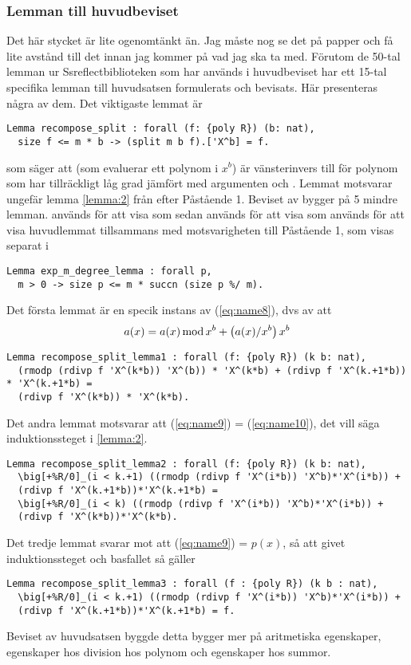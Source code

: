 \subsubsection{Lemman till huvudbeviset}
Det här stycket är lite ogenomtänkt än. Jag måste nog se det på papper och få
lite avstånd till det innan jag kommer på vad jag ska ta med. Förutom de 50-tal
lemman ur Ssreflectbiblioteken som har används i huvudbeviset har ett 15-tal
specifika lemman till huvudsatsen formulerats och bevisats. Här presenteras
några av dem. Det viktigaste lemmat är
\begin{lstlisting}
Lemma recompose_split : forall (f: {poly R}) (b: nat),
  size f <= m * b -> (split m b f).['X^b] = f.
\end{lstlisting}
som säger att  (som evaluerar ett polynom i $x^b$) är
vänsterinvers till  för polynom som har tillräckligt låg grad jämfört
med argumenten  och . Lemmat motsvarar ungefär lemma \ref{lemma:2}
från efter Påstående 1. Beviset av  bygger på 5 mindre
lemman.  används för att visa
 som sedan används för att visa
 som används för att visa huvudlemmat tillsammans med
motsvarigheten till Påstående 1, som visas separat i
\begin{lstlisting}
Lemma exp_m_degree_lemma : forall p,
  m > 0 -> size p <= m * succn (size p %/ m).
\end{lstlisting}
Det första lemmat är en specik instans av (\ref{eq:name8}), dvs av att
\begin{align}
  a(x)= a(x)  \operatorname*{mod} x^b + \left(a(x)/x^b\right) x^b \label{eq:name8}
\end{align}
\begin{lstlisting}
Lemma recompose_split_lemma1 : forall (f: {poly R}) (k b: nat),
  (rmodp (rdivp f 'X^(k*b)) 'X^(b)) * 'X^(k*b) + (rdivp f 'X^(k.+1*b)) * 'X^(k.+1*b) =
  (rdivp f 'X^(k*b)) * 'X^(k*b).
\end{lstlisting}
Det andra lemmat motsvarar att (\ref{eq:name9}) = (\ref{eq:name10}), det vill
säga induktionssteget
i \ref{lemma:2}.
\begin{lstlisting}
Lemma recompose_split_lemma2 : forall (f: {poly R}) (k b: nat),
  \big[+%R/0]_(i < k.+1) ((rmodp (rdivp f 'X^(i*b)) 'X^b)*'X^(i*b)) +
  (rdivp f 'X^(k.+1*b))*'X^(k.+1*b) =
  \big[+%R/0]_(i < k) ((rmodp (rdivp f 'X^(i*b)) 'X^b)*'X^(i*b)) +
  (rdivp f 'X^(k*b))*'X^(k*b).
\end{lstlisting}
Det tredje lemmat svarar mot att (\ref{eq:name9}) = $p(x)$, så att givet
induktionssteget  och basfallet
 så gäller
\begin{lstlisting}
Lemma recompose_split_lemma3 : forall (f : {poly R}) (k b : nat),
  \big[+%R/0]_(i < k.+1) ((rmodp (rdivp f 'X^(i*b)) 'X^b)*'X^(i*b)) +
  (rdivp f 'X^(k.+1*b))*'X^(k.+1*b) = f.
\end{lstlisting}
Beviset av huvudsatsen byggde detta bygger mer på aritmetiska egenskaper,
egenskaper hos division hos polynom och egenskaper hos summor.

